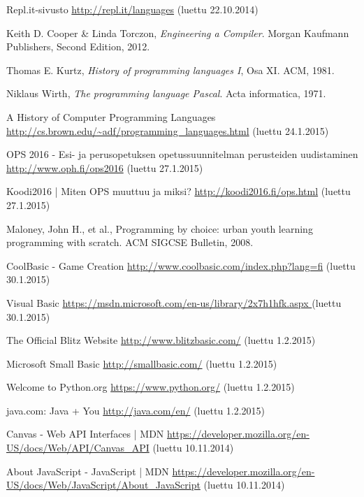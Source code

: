 
\begin{thebibliography}{99}

	Repl.it-sivusto \url{http://repl.it/languages} (luettu 22.10.2014)

	Keith D. Cooper \& Linda Torczon,
	\emph{Engineering a Compiler}.
	Morgan Kaufmann Publishers,
	Second Edition,
	2012.

	Thomas E. Kurtz,
	\emph{History of programming languages I}, Osa XI.
	ACM,
	1981.

	Niklaus Wirth,
	\emph{The programming language Pascal}.
	Acta informatica,
	1971.
	
	A History of Computer Programming Languages \url{http://cs.brown.edu/~adf/programming_languages.html} (luettu 24.1.2015)
	
	OPS 2016 - Esi- ja perusopetuksen opetussuunnitelman perusteiden uudistaminen \url{http://www.oph.fi/ops2016} (luettu 27.1.2015)

	Koodi2016 | Miten OPS muuttuu ja miksi? \url{http://koodi2016.fi/ops.html} (luettu 27.1.2015)

	Maloney, John H., et al.,
	Programming by choice: urban youth learning programming with scratch.
	ACM SIGCSE Bulletin,
	2008.

	CoolBasic - Game Creation \url{http://www.coolbasic.com/index.php?lang=fi} (luettu 30.1.2015)
	
	Visual Basic \url{https://msdn.microsoft.com/en-us/library/2x7h1hfk.aspx
} (luettu 30.1.2015)

	The Official Blitz Website \url{http://www.blitzbasic.com/} (luettu 1.2.2015)

	Microsoft Small Basic \url{http://smallbasic.com/} (luettu 1.2.2015)

	Welcome to Python.org \url{https://www.python.org/} (luettu 1.2.2015)

	java.com: Java + You \url{http://java.com/en/} (luettu 1.2.2015)
	
	Canvas - Web API Interfaces | MDN \url{https://developer.mozilla.org/en-US/docs/Web/API/Canvas_API} (luettu 10.11.2014)

	About JavaScript - JavaScript | MDN \url{https://developer.mozilla.org/en-US/docs/Web/JavaScript/About_JavaScript} (luettu 10.11.2014)
	

\end{thebibliography}
